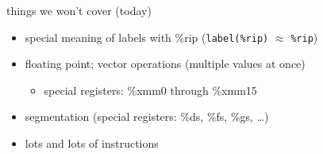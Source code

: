 
\begin{frame}{things we won't cover (today)}
    \begin{itemize}
        \item special meaning of labels with \%rip ({\tt label(\%rip)} $\approx$ {\tt \%rip})
        \item floating point; vector operations (multiple values at once)
            \begin{itemize}
            \item special registers: \%xmm0 through \%xmm15
            \end{itemize}
        \item segmentation (special registers: \%ds, \%fs, \%gs, \ldots)
        \item lots and lots of instructions
    \end{itemize}
\end{frame}
